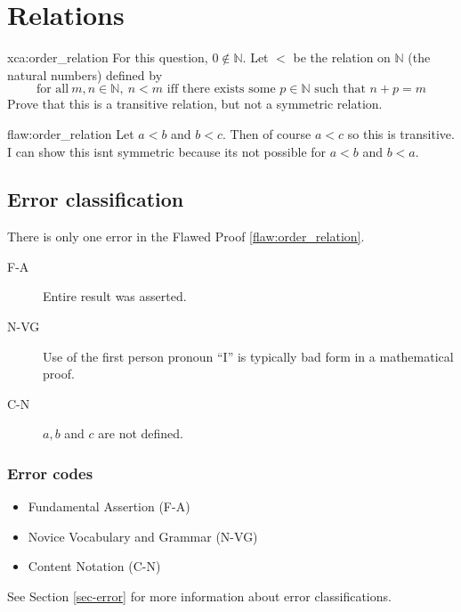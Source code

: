 \section{Relations}

\begin{xca}{xca:order_relation}
For this question, $0 \notin \mathbb{N}$. Let $<$ be the relation on $\mathbb{N}$ (the natural numbers) defined by 
$$\text{for all} \: m,n \in \mathbb{N}, \: n < m  \text{ iff there exists some } p \in \mathbb{N} \text{ such that } n+p = m $$
Prove that this is a transitive relation, but not a symmetric relation. 
\end{xca}

\begin{flaw}{flaw:order_relation} %
Let $a<b$ and $b<c$. Then of course $a<c$ so this is transitive.\\

\noindent I can show this isnt symmetric because its not possible for $a<b$ and $b<a$. 
\end{flaw}

\clearpage
\subsection{Error classification}


There is only one error
 in the Flawed Proof \ref{flaw:order_relation}. %

 
 \begin{description}
    \item[F-A] Entire result was asserted. \item[N-VG] Use of the first person pronoun ``I'' is typically bad form in a mathematical proof.
 	\item[C-N] $a,b$ and $c$ are not defined. 
 \end{description}

 
\subsubsection{Error codes}
\begin{itemize}
	\item Fundamental Assertion (F-A)
	\item Novice Vocabulary and Grammar (N-VG)
	\item Content Notation (C-N)
\end{itemize}
See Section \ref{sec-error} for more information about error classifications.

